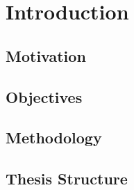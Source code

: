 \chapter{Introduction}
\label{chapter:introduction}

\section{Motivation}
\section{Objectives}
\section{Methodology}
\section{Thesis Structure}
